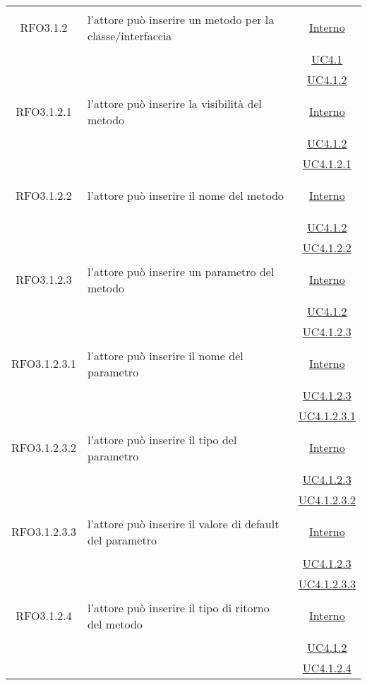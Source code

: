 \begin{longtable}{|c|>{\centering}m{7cm}|c|}
\hypertarget{RFO3.1.2}{RFO3.1.2} & l'attore può inserire un metodo per la classe/interfaccia & \hyperlink{Interno}{Interno}\\
& &\hyperref[UC4.1]{UC4.1}\\
& &\hyperref[UC4.1.2]{UC4.1.2}\\ \hline

\hypertarget{RFO3.1.2.1}{RFO3.1.2.1} & l'attore può inserire la visibilità del metodo & \hyperlink{Interno}{Interno}\\
& &\hyperref[UC4.1.2]{UC4.1.2}\\
& &\hyperref[UC4.1.2.1]{UC4.1.2.1}\\ \hline

\hypertarget{RFO3.1.2.2}{RFO3.1.2.2} & l'attore può inserire il nome del metodo & \hyperlink{Interno}{Interno}\\
& &\hyperref[UC4.1.2]{UC4.1.2}\\
& &\hyperref[UC4.1.2.2]{UC4.1.2.2}\\ \hline

\hypertarget{RFO3.1.2.3}{RFO3.1.2.3} & l'attore può inserire un parametro del metodo & \hyperlink{Interno}{Interno}\\
& &\hyperref[UC4.1.2]{UC4.1.2}\\
& &\hyperref[UC4.1.2.3]{UC4.1.2.3}\\ \hline

\hypertarget{RFO3.1.2.3.1}{RFO3.1.2.3.1} & l'attore può inserire il nome del parametro & \hyperlink{Interno}{Interno}\\
& &\hyperref[UC4.1.2.3]{UC4.1.2.3}\\
& &\hyperref[UC4.1.2.3.1]{UC4.1.2.3.1}\\ \hline

\hypertarget{RFO3.1.2.3.2}{RFO3.1.2.3.2} & l'attore può inserire il tipo del parametro & \hyperlink{Interno}{Interno}\\
& &\hyperref[UC4.1.2.3]{UC4.1.2.3}\\
& &\hyperref[UC4.1.2.3.2]{UC4.1.2.3.2}\\ \hline

\hypertarget{RFO3.1.2.3.3}{RFO3.1.2.3.3} & l'attore può inserire il valore di default del parametro & \hyperlink{Interno}{Interno}\\
& &\hyperref[UC4.1.2.3]{UC4.1.2.3}\\
& &\hyperref[UC4.1.2.3.3]{UC4.1.2.3.3}\\ \hline

\hypertarget{RFO3.1.2.4}{RFO3.1.2.4} & l'attore può inserire il tipo di ritorno del metodo & \hyperlink{Interno}{Interno}\\
& &\hyperref[UC4.1.2]{UC4.1.2}\\
& &\hyperref[UC4.1.2.4]{UC4.1.2.4}\\ \hline


\end{longtable}

